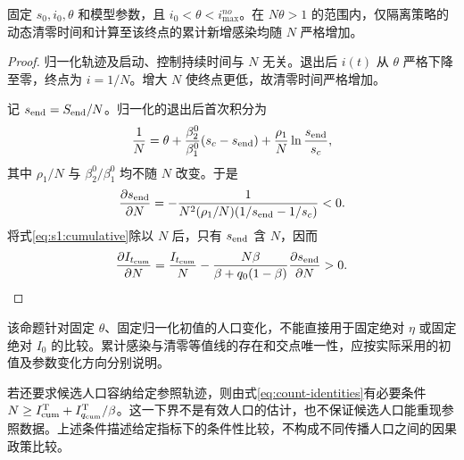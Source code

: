 \documentclass[lang=cn,a4paper,newtx]{elegantpaper}
\numberwithin{equation}{section}
\theoremstyle{plain}
\newcommand{\Itcum}{I_{t_{\mathrm{cum}}}}
\begin{document}
\begin{proposition}
\label{prop:reference-population}
固定 $s_0,i_0,\theta$ 和模型参数，且 $i_0<\theta<i_{\max}^{no}$。在 $N\theta>1$ 的范围内，仅隔离策略的动态清零时间和计算至该终点的累计新增感染均随 $N$ 严格增加。
\end{proposition}
\begin{proof}
归一化轨迹及启动、控制持续时间与 $N$ 无关。退出后 $i(t)$ 从 $\theta$ 严格下降至零，终点为 $i=1/N$。增大 $N$ 使终点更低，故清零时间严格增加。

记 $s_{\rm end}=S_{\rm end}/N$。归一化的退出后首次积分为
\[
\frac1N=\theta+\frac{\beta_2^0}{\beta_1^0}(s_c-s_{\rm end})
+\frac{\rho_1}{N}\ln\frac{s_{\rm end}}{s_c},
\]
其中 $\rho_1/N$ 与 $\beta_2^0/\beta_1^0$ 均不随 $N$ 改变。于是
\[
\frac{\partial s_{\rm end}}{\partial N}
=-\frac1{N^2(\rho_1/N)(1/s_{\rm end}-1/s_c)}<0.
\]
将式\eqref{eq:s1:cumulative}除以 $N$ 后，只有 $s_{\rm end}$ 含 $N$，因而
\[
\frac{\partial\Itcum}{\partial N}
=\frac{\Itcum}{N}
-\frac{N\beta}{\beta+q_0(1-\beta)}\frac{\partial s_{\rm end}}{\partial N}>0.\qedhere
\]
\end{proof}
该命题针对固定 $\theta$、固定归一化初值的人口变化，不能直接用于固定绝对 $\eta$ 或固定绝对 $I_0$ 的比较。累计感染与清零等值线的存在和交点唯一性，应按实际采用的初值及参数变化方向分别说明。

若还要求候选人口容纳给定参照轨迹，则由式\eqref{eq:count-identities}有必要条件 $N\ge I^{\rm T}_{\rm cum}+I^{\rm T}_{q_{\rm cum}}/\beta$。这一下界不是有效人口的估计，也不保证候选人口能重现参照数据。上述条件描述给定指标下的条件性比较，不构成不同传播人口之间的因果政策比较。


\FloatBarrier
\printbibliography[title={参考文献}]
\end{document}
